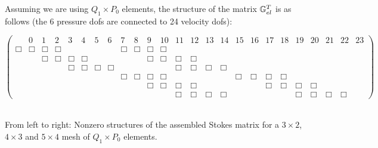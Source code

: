 Assuming we are using $Q_1\times P_0$ elements, the structure of the matrix ${\mathbb{G}}_{el}^T$ is as follows
(the 6 pressure dofs are connected to 24 velocity dofs):

\begin{scriptsize}
\begin{equation}
\left(
\begin{array}{ccccccccccccccccccccccccc}
&0 & 1 & 2 & 3 & 4 & 5 & 6 & 7 & 8 & 9 & 10 & 11 & 12 & 13 & 14 & 15 & 16 & 17 & 18 & 19 & 20 & 21 & 22 & 23     \\
\Box&\Box & \Box&\Box &  &  &  &  & \Box&\Box & \Box&\Box &  &  &  &  &  &  &  &  &  &  &  &  \\
    &     & \Box&\Box & \Box&\Box &  &  &  &  & \Box&\Box & \Box&\Box &  &  &  &  &  &  &  &  &  &  \\
 & &     &     & \Box&\Box & \Box&\Box &  &  &  &  & \Box&\Box & \Box&\Box &  &  &  &  &  &  &  &    \\
 & & & &  & &     &     & \Box&\Box & \Box&\Box &  &  &  &  & \Box&\Box & \Box&\Box &  &  &  &      \\
 & & & & & &  & &     &     & \Box&\Box & \Box&\Box &  &  &  &  & \Box&\Box & \Box&\Box &  &       \\
 & &  & & & & & &  & &     &     & \Box&\Box & \Box&\Box &  &  &  &  & \Box&\Box & \Box&\Box        
\end{array}
\right)
\end{equation} 
\end{scriptsize}

\begin{center}


\\
{\captionfont From left to right: Nonzero structures of the assembled Stokes matrix for a 
$3\times 2$, $4\times 3$ and $5\times 4$ mesh of $Q_1\times P_0$ elements.}
\end{center}


